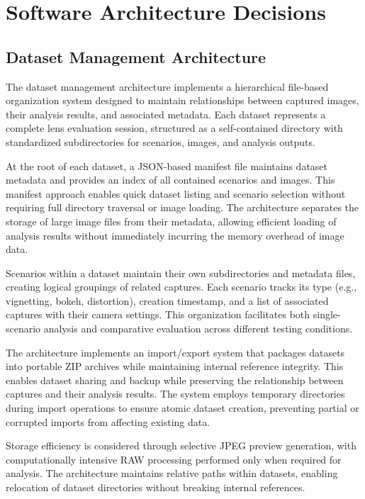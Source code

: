 \section{Software Architecture Decisions}

\subsection{Dataset Management Architecture}
The dataset management architecture implements a hierarchical file-based organization system designed to maintain relationships between captured images, their analysis results, and associated metadata. Each dataset represents a complete lens evaluation session, structured as a self-contained directory with standardized subdirectories for scenarios, images, and analysis outputs.

At the root of each dataset, a JSON-based manifest file maintains dataset metadata and provides an index of all contained scenarios and images. This manifest approach enables quick dataset listing and scenario selection without requiring full directory traversal or image loading. The architecture separates the storage of large image files from their metadata, allowing efficient loading of analysis results without immediately incurring the memory overhead of image data.

Scenarios within a dataset maintain their own subdirectories and metadata files, creating logical groupings of related captures. Each scenario tracks its type (e.g., vignetting, bokeh, distortion), creation timestamp, and a list of associated captures with their camera settings. This organization facilitates both single-scenario analysis and comparative evaluation across different testing conditions.

The architecture implements an import/export system that packages datasets into portable ZIP archives while maintaining internal reference integrity. This enables dataset sharing and backup while preserving the relationship between captures and their analysis results. The system employs temporary directories during import operations to ensure atomic dataset creation, preventing partial or corrupted imports from affecting existing data.

Storage efficiency is considered through selective JPEG preview generation, with computationally intensive RAW processing performed only when required for analysis. The architecture maintains relative paths within datasets, enabling relocation of dataset directories without breaking internal references.

